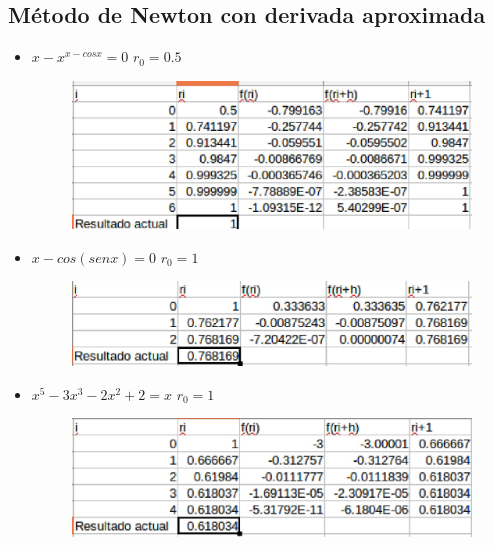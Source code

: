 \documentclass[a4paper,12pt]{article}
\begin{document}
    
    \newpage
  
    \subsection{Método de Newton con derivada aproximada}
    
    \begin{itemize}
    \item $x-x^{x-cosx} = 0$ $r_{0} = 0.5$
     
     \begin{figure}[h]
      \centering
      \includegraphics[scale = 0.6]{61.eps}
     \end{figure}
   
    
    \item $x-cos(senx) = 0$ $r_{0} = 1$
      
      \begin{figure}[h]
      \centering
      \includegraphics[scale = 0.6]{62.eps}
     \end{figure}
    
    \item $x^5 - 3x^3 - 2x^2 + 2 = x$ $r_{0} = 1$
     
      \begin{figure}[h]
      \centering
      \includegraphics[scale = 0.6]{63.eps}
     \end{figure}
    
    \end{itemize}
\end{document}
